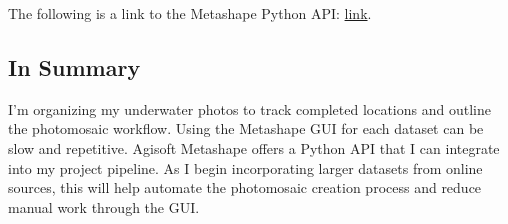 \documentclass[a4paper,12pt]{article}
\begin{document}
The following is a link to the Metashape Python API:
\href{https://www.agisoft.com/pdf/metashape_python_api_2_2_0.pdf}{link}.

\newpage
\subsection{In Summary}
I’m organizing my underwater photos to track completed locations and outline the photomosaic workflow. Using the Metashape GUI for each dataset can be slow and repetitive. Agisoft Metashape offers a Python API that I can integrate into my project pipeline. As I begin incorporating larger datasets from online sources, this will help automate the photomosaic creation process and reduce manual work through the GUI.

\newpage



\end{document}
